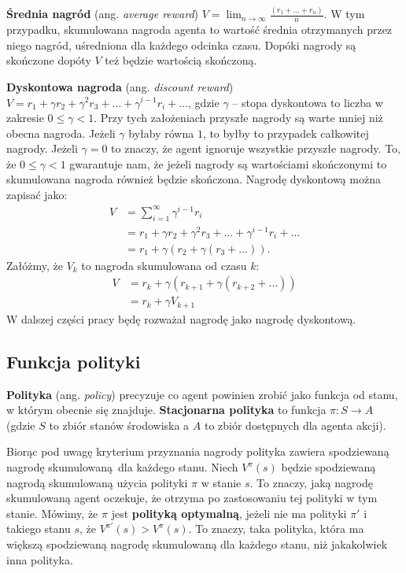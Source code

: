 \documentclass[a4paper, 12pt,oneside]{book}
\begin{document}
\textbf{Średnia nagród} (ang. \textit{average reward}) $V =
\lim_{n\to\infty}\frac{(r_1 + \dots + r_n)}{n}$. W tym przypadku, skumulowana
nagroda agenta to wartość średnia otrzymanych przez niego nagród, uśredniona
dla każdego odcinka czasu. Dopóki nagrody są skończone dopóty $V$ też będzie
wartością skończoną.

\textbf{Dyskontowa nagroda} (ang. \textit{discount reward}) $V = r_1 + \gamma
r_2 + \gamma^2 r_3 + \dots + \gamma^{i-1} r_i + \dots$, gdzie $\gamma$ -- stopa
dyskontowa to liczba w zakresie $0 \leq \gamma < 1$. Przy tych założeniach
przyszłe nagrody są warte mniej niż obecna nagroda. Jeżeli $\gamma$ byłaby
równa $1$, to byłby to przypadek całkowitej nagrody. Jeżeli $\gamma = 0$ to
znaczy, że agent ignoruje wszystkie przyszłe nagrody. To, że $0 \leq \gamma <
1$ gwarantuje nam, że jeżeli nagrody są wartościami skończonymi to skumulowana
nagroda również będzie skończona. Nagrodę dyskontową można zapisać jako:
\begin{equation} \label{discount_reward}
\begin{split}
	V &= \sum_{i=1}^{\infty} \gamma^{i - 1} r_i \\
	  &= r_1 + \gamma r_2 + \gamma^2 r_3 + \dots + \gamma^{i-1}r_i +\dots\\
	  &= r_1 + \gamma(r_2 +\gamma(r_3 + \dots)).
\end{split}
\end{equation}
Załóżmy, że $V_k$ to nagroda skumulowana od czasu $k$:
\begin{equation} \label{discount_reward_2}
\begin{split}
	V &= r_k + \gamma(r_{k+1} +\gamma(r_{k+2} + \dots))\\
	&= r_k + \gamma V_{k+1}
\end{split}
\end{equation}
W dalszej części pracy będę rozważał nagrodę jako nagrodę dyskontową.

\subsection{Funkcja polityki}
\textbf{Polityka} (ang. \textit{policy}) precyzuje co agent powinien zrobić
jako funkcja od stanu, w którym obecnie się znajduje\cite{sawka_ml}.
\textbf{Stacjonarna polityka} to funkcja $\pi : S \rightarrow A$ (gdzie $S$ to
zbiór stanów środowiska a $A$ to zbiór dostępnych dla agenta akcji).

Biorąc pod uwagę kryterium przyznania nagrody polityka zawiera spodziewaną
nagrodę skumulowaną dla każdego stanu. Niech $V^{\pi}(s)$ będzie spodziewaną
nagrodą skumulowaną użycia polityki $\pi$ w stanie $s$. To znaczy, jaką nagrodę
skumulowaną agent oczekuje, że otrzyma po zastosowaniu tej polityki w tym
stanie. Mówimy, że $\pi$ jest \textbf{polityką optymalną}, jeżeli nie ma
polityki $\pi'$ i takiego stanu $s$, że $V^{\pi'}(s) > V^{\pi}(s)$. To znaczy,
taka polityka, która ma większą spodziewaną nagrodę skumulowaną dla
każdego stanu, niż jakakolwiek inna polityka.
\end{document}

